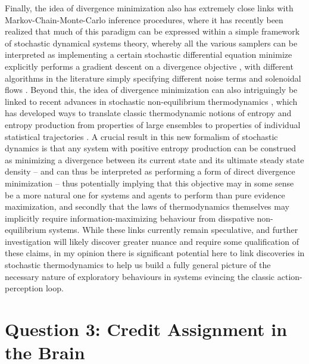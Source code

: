 Finally, the idea of divergence minimization also has extremely close links with Markov-Chain-Monte-Carlo inference procedures, where it has recently been realized that much of this paradigm can be expressed within a simple framework of stochastic dynamical systems theory, whereby all the various samplers can be interpreted as implementing a certain stochastic differential equation minimize explicitly performs a gradient descent on a divergence objective \citep{ma2015complete}, with different algorithms in the literature simply specifying different noise terms and solenoidal flows \citep{yuan2017sde}. Beyond this, the idea of divergence minimization can also intriguingly be linked to recent advances in stochastic non-equilibrium thermodynamics \citep{seifert2012stochastic}, which has developed ways to translate classic thermodynamic notions of entropy and entropy production from properties of large ensembles to properties of individual statistical trajectories \citep{esposito2010three1}. A crucial result in this new formalism of stochastic dynamics is that any system with positive entropy production can be construed as minimizing a divergence between its current state and its ultimate steady state density \citep{esposito2010three1} -- and can thus be interpreted as performing a form of direct divergence minimization -- thus potentially implying that this objective may in some sense be a more natural one for systems and agents to perform than pure evidence maximization, and secondly that the laws of thermodynamics themselves may implicitly require information-maximizing behaviour from disspative non-equilibrium systems. While these links currently remain speculative, and further investigation will likely discover greater nuance and require some qualification of these claims, in my opinion there is significant potential here to link discoveries in stochastic thermodynamics to help us build a fully general picture of the necessary nature of exploratory behaviours in systems evincing the classic action-perception loop.

\section{Question 3: Credit Assignment in the Brain}

